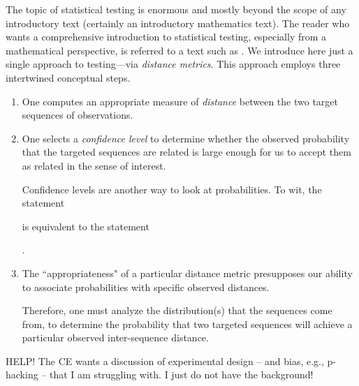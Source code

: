 \medskip

The topic of statistical testing is enormous and mostly beyond the scope of any introductory text (certainly an introductory mathematics text).  The reader who wants a comprehensive introduction to statistical testing, especially from a mathematical perspective, is referred to a text such as \cite{Hoel58}.   We introduce here just a single approach to testing---via {\em distance metrics}.  This approach employs three intertwined conceptual steps.
\begin{enumerate}
\item
One computes an appropriate measure of {\em distance} between the two target sequences of observations.

\medskip\item
One selects a {\em confidence level} to determine whether the observed probability that the targeted sequences are related is large enough for us to accept them as related in the sense of interest.

\medskip

Confidence levels are another way to look at probabilities.  To wit, the statement

\hspace*{.2in}{\em the probability that the assertion $A$ is true is $p\%$}

is equivalent to the statement

\hspace*{.2in}{\em assertion $A$ is true with a confidence level of $p\%$}.

\medskip\item
The ``appropriateness" of a particular distance metric presupposes our ability to associate probabilities with specific observed distances.

\smallskip

Therefore, one must analyze the distribution(s) that the sequences come from, to determine the probability that two targeted sequences will achieve a particular observed inter-sequence distance.
\end{enumerate}

{\Arny HELP!  The CE wants a discussion of experimental design -- and bias, e.g., p-hacking -- that I am struggling with.  I just do not have the background!}


\bigskip

\noindent {}

